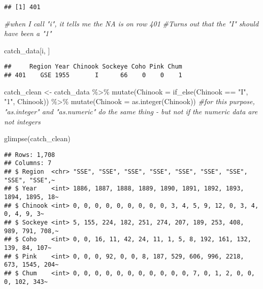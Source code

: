\documentclass[
]{article}
\newenvironment{Shaded}{\begin{snugshade}}{\end{snugshade}}
\newcommand{\AttributeTok}[1]{\textcolor[rgb]{0.77,0.63,0.00}{#1}}
\newcommand{\CommentTok}[1]{\textcolor[rgb]{0.56,0.35,0.01}{\textit{#1}}}
\newcommand{\FunctionTok}[1]{\textcolor[rgb]{0.00,0.00,0.00}{#1}}
\newcommand{\NormalTok}[1]{#1}
\newcommand{\OtherTok}[1]{\textcolor[rgb]{0.56,0.35,0.01}{#1}}
\newcommand{\SpecialCharTok}[1]{\textcolor[rgb]{0.00,0.00,0.00}{#1}}
\newcommand{\StringTok}[1]{\textcolor[rgb]{0.31,0.60,0.02}{#1}}
\begin{document}
\begin{Shaded}
\end{Shaded}

\begin{verbatim}
## [1] 401
\end{verbatim}

\begin{Shaded}
\begin{Highlighting}[]
\CommentTok{\#when I call "i", it tells me the NA is on row 401}
\CommentTok{\#Turns out that the "I" should have been a "1"}

\NormalTok{catch\_data[i, ]}
\end{Highlighting}
\end{Shaded}

\begin{verbatim}
##     Region Year Chinook Sockeye Coho Pink Chum
## 401    GSE 1955       I      66    0    0    1
\end{verbatim}

\begin{Shaded}
\begin{Highlighting}[]
\NormalTok{catch\_clean }\OtherTok{\textless{}{-}}\NormalTok{ catch\_data }\SpecialCharTok{\%\textgreater{}\%}
  \FunctionTok{mutate}\NormalTok{(}\AttributeTok{Chinook =} \FunctionTok{if\_else}\NormalTok{(Chinook }\SpecialCharTok{==} \StringTok{"I"}\NormalTok{, }\StringTok{"1"}\NormalTok{, Chinook)) }\SpecialCharTok{\%\textgreater{}\%}
  \FunctionTok{mutate}\NormalTok{(}\AttributeTok{Chinook =} \FunctionTok{as.integer}\NormalTok{(Chinook))}
\CommentTok{\#for this purpose, "as.integer" and "as.numeric" do the same thing {-} but not if the numeric data are not integers}

\FunctionTok{glimpse}\NormalTok{(catch\_clean)}
\end{Highlighting}
\end{Shaded}

\begin{verbatim}
## Rows: 1,708
## Columns: 7
## $ Region  <chr> "SSE", "SSE", "SSE", "SSE", "SSE", "SSE", "SSE", "SSE", "SSE",~
## $ Year    <int> 1886, 1887, 1888, 1889, 1890, 1891, 1892, 1893, 1894, 1895, 18~
## $ Chinook <int> 0, 0, 0, 0, 0, 0, 0, 0, 0, 3, 4, 5, 9, 12, 0, 3, 4, 0, 4, 9, 3~
## $ Sockeye <int> 5, 155, 224, 182, 251, 274, 207, 189, 253, 408, 989, 791, 708,~
## $ Coho    <int> 0, 0, 16, 11, 42, 24, 11, 1, 5, 8, 192, 161, 132, 139, 84, 107~
## $ Pink    <int> 0, 0, 0, 92, 0, 0, 8, 187, 529, 606, 996, 2218, 673, 1545, 204~
## $ Chum    <int> 0, 0, 0, 0, 0, 0, 0, 0, 0, 0, 0, 7, 0, 1, 2, 0, 0, 0, 102, 343~
\end{verbatim}
\end{document}
